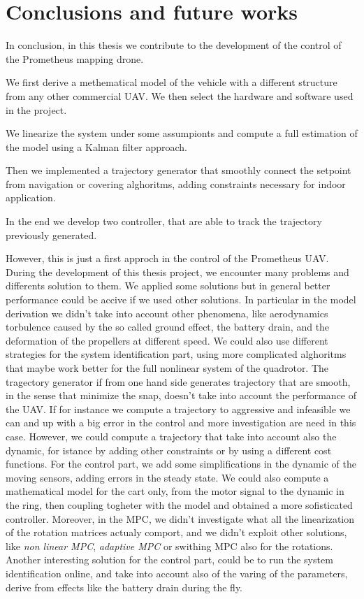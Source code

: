 \chapter{Conclusions and future works}
\label{conclusions}

In conclusion, in this thesis we contribute to the development of the control of the Prometheus mapping drone. 

\noindent We first derive a methematical model of the vehicle with a different structure from any other commercial UAV. We then select the hardware and software used in the project. 

\noindent We linearize the system under some assumpionts and compute a full estimation of the model using a Kalman filter approach.

\noindent Then we implemented a trajectory generator that smoothly connect the setpoint from navigation or covering alghoritms, adding constraints necessary for indoor application.

\noindent In the end we develop two controller, that are able to track the trajectory previously generated.

\noindent However, this is just a first approch in the control of the Prometheus UAV. During the development of this thesis project, we encounter many problems and differents solution to them. We applied some solutions but in general better performance could be accive if we used other solutions. In particular in the model derivation we didn't take into account other phenomena, like aerodynamics torbulence caused by the so called ground effect, the battery drain, and the deformation of the propellers at different speed. We could also use different strategies for the system identification part, using more complicated alghoritms that maybe work better for the full nonlinear system of the quadrotor. The tragectory generator if from one hand side generates trajectory that are smooth, in the sense that minimize the snap, doesn't take into account the performance of the UAV. If for instance we compute a trajectory to aggressive and infeasible we can and up with a big error in the control and more investigation are need in this case. However, we could compute a trajectory that take into account also the dynamic, for istance by adding other constraints or by using a different cost functions. For the control part,  we add some simplifications in the dynamic of the moving sensors, adding errors in the steady state. We could also compute a mathematical model for the cart only, from the motor signal to the dynamic in the ring, then coupling togheter with the model and obtained a more sofisticated controller. Moreover, in the MPC, we didn't investigate what all the linearization of the rotation matrices actualy comport, and we didn't exploit other solutions, like \textit{non linear MPC}, \textit{adaptive MPC} or swithing MPC also for the rotations. Another interesting solution for the control part, could be to run the system identification online, and take into account also of the varing of the parameters, derive from effects like the battery drain during the fly.